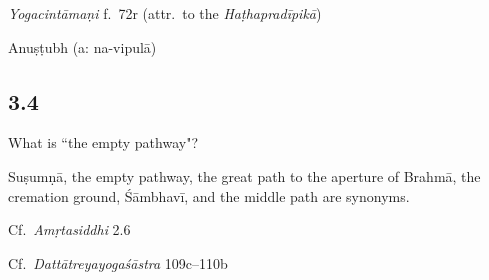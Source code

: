 \begin{ekdosis}
\begin{sources}[hp03_003]
\end{sources}

\begin{testimonia}[hp03_003]
\emph{Yogacintāmaṇi} f.~72r (attr.~to the \emph{Haṭhapradīpikā})

\begin{versinnote}
\end{versinnote}

\end{testimonia}


\begin{metre}[hp03_003]
Anuṣṭubh (a: na-vipulā)
\end{metre}

\subsection*{3.4}
What is ``the empty pathway"?

\begin{translation}[hp03_004]
Suṣumṇā, the empty pathway, the great path to the aperture of Brahmā, the cremation ground, Śāmbhavī, and the middle path are synonyms.
\end{translation}

\begin{sources}[hp03_004]
Cf.~\emph{Amṛtasiddhi} 2.6
\begin{versinnote}
\end{versinnote}

Cf.~\emph{Dattātreyayogaśāstra} 109c–110b
\begin{versinnote}
\end{versinnote}
\end{sources}


\end{ekdosis}
